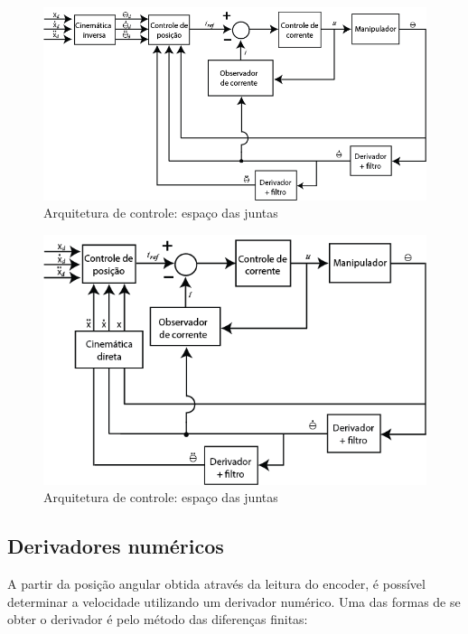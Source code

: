 \documentclass[]{politex}
\begin{document}
\begin{figure}[H]
    \centering
    \includegraphics[scale=0.5]{imagens/ControleEspacoDasJuntas.png}
    \caption{Arquitetura de controle: espaço das juntas}
    \label{fig:ControleEspacoDasJuntas}
\end{figure}

\begin{figure}[H]
    \centering
    \includegraphics[scale=0.5]{imagens/ControleEspacoDaTarefa.png}
    \caption{Arquitetura de controle: espaço das juntas}
    \label{fig:ControleEspacoDaTarefa}
\end{figure}

\subsection{Derivadores numéricos}
\label{derivador}

A partir da posição angular obtida através da leitura do encoder, é possível determinar a velocidade utilizando um derivador numérico. Uma das formas de se obter o derivador é pelo método das diferenças finitas:
\end{document}
